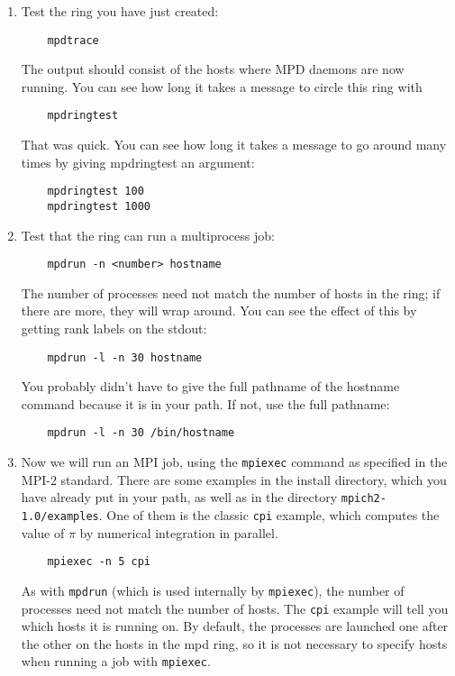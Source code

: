 \documentclass[dvipdfm,11pt]{article}
\begin{document}
\begin{enumerate}
\item
Test the ring you have just created:
\begin{verbatim}
    mpdtrace
\end{verbatim}
The output should consist of the hosts where MPD daemons are now
running.  You can see how long it takes a message to circle this
ring with 
\begin{verbatim}
    mpdringtest
\end{verbatim}
That was quick.  You can see how long it takes a message to go
around many times by giving mpdringtest an argument:
\begin{verbatim}
    mpdringtest 100
    mpdringtest 1000
\end{verbatim}

\item
Test that the ring can run a multiprocess job:
\begin{verbatim}
    mpdrun -n <number> hostname
\end{verbatim}
The number of processes need not match the number of hosts in the
ring;  if there are more, they will wrap around.  You can see the
effect of this by getting rank labels on the stdout:
\begin{verbatim}
    mpdrun -l -n 30 hostname
\end{verbatim}
You probably didn't have to give the full pathname of the hostname
command because it is in your path.  If not, use the full pathname:
\begin{verbatim}
    mpdrun -l -n 30 /bin/hostname
\end{verbatim}

\item
Now we will run an MPI job, using the \texttt{mpiexec} command as specified
in the MPI-2 standard.  There are some examples in the install
directory, which you have already put in your path, as well as in
the directory \texttt{mpich2-1.0/examples}.  One of them is the classic \texttt{cpi}
example, which computes the value of $\pi$ by numerical integration in
parallel.   
\begin{verbatim}
    mpiexec -n 5 cpi
\end{verbatim}
As with \texttt{mpdrun} (which is used internally by \texttt{mpiexec}), the number of
processes need not match the number of hosts.  The \texttt{cpi} example will
tell you which hosts it is running on.  By default, the processes
are launched one after the other on the hosts in the mpd ring, so it
is not necessary to specify hosts when running a job with \texttt{mpiexec}.


\end{enumerate}
\end{document}
